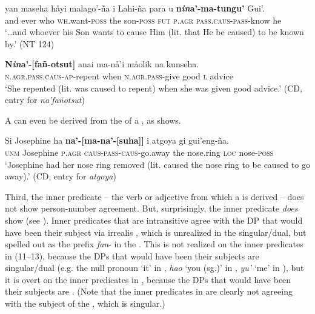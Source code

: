 \documentclass[output=paper,
modfonts
]{LSP/langsci}
\begin{document}
\begin{exe}
\begin{xlist}
\begin{exe}
\ex \label{ex:chung:12} \begin{xlist}
\ex \label{ex:chung:12a}
\gll  {\dots} yan maseha håyi malago'-ña i Lahi-ña para u \textbf{n\emph{in}a'-{\ob}ma-tungu'{\cb}} Gui'.\\
{ } and ever who \textsc{wh.}want-\textsc{poss} the son-\textsc{poss} \textsc{fut}
\textsc{p.agr} \textsc{pass.caus-pass-}know he\\
\glt `{\dots}and whoever his Son wants to cause Him (lit. that He be caused) to
be known by.' (NT 124)

\ex \label{ex:chung:12b} \gll \textbf{N\emph{in}a'-{[}fañ-otsut{]}} anai ma-nå'i måolik na kunseha.\\
\textsc{n.agr.pass.caus-ap-}repent when \textsc{n.agr.pass-}give good
\textsc{l} advice\\

\glt `She repented (lit. was caused to repent) when she was given good
advice.' (CD, entry for \emph{na'fañotsut})
\end{xlist}
\end{exe}

A  can even be derived from the  of a , as 
shows.

\begin{exe}
\ex \label{ex:chung:13}
\gll Si Josephine ha \textbf{na'-{[}ma-na'-{[}suha{]}{]}} i atgoya gi gui'eng-ña.\\
\textsc{unm} Josephine \textsc{p.agr} \textsc{caus-pass-caus-}go.away the
nose.ring \textsc{loc} nose-\textsc{poss}\\
\glt `Josephine had her nose ring removed (lit. caused the nose ring to be
caused to go away).' (CD, entry for \emph{atgoya})
\end{exe}

Third, the inner predicate -- the verb or adjective from which a
 is derived -- does not show person-number agreement. But,
surprisingly, the inner predicate \emph{does} show  (see
\citealt[112--114]{gibson1980}). Inner predicates that are intransitive agree with
the DP that would have been their subject via irrealis ,
which is unrealized in the singular/dual, but spelled out as the prefix
\emph{fan}- in the . This  is not realized on the
inner predicates in (11--13), because the DPs that would have been their
subjects are singular/dual (e.g. the null pronoun `it' in ,
\emph{hao} `you (sg.)' in , \emph{yu'} `me' in ), but it is
overt on the inner predicates in , because the DPs that would have
been their subjects are . (Note that the inner predicates in 
are clearly not agreeing with the subject of the , which is
singular.)


\end{xlist}
\end{exe}
\end{document}
